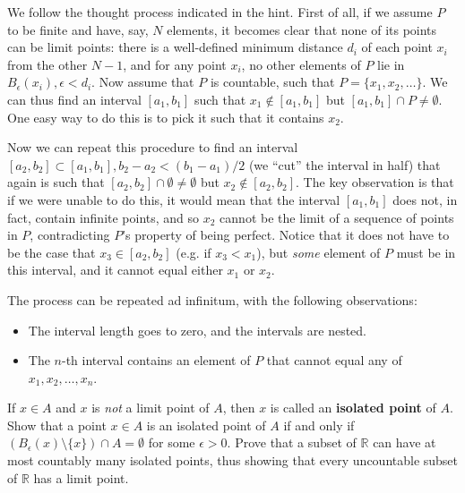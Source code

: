 \begin{solution}
    
    We follow the thought process indicated in the hint.
    First of all, if we assume $P$ to be finite and have, say, $N$ elements, it becomes clear that none of its points can be limit points: there is a well-defined minimum distance $d_i$ of each point $x_i$ from the other $N - 1$, and for any point $x_i$, no other elements of $P$ lie in $B_\epsilon(x_i), \epsilon < d_i$.
    Now assume that $P$ is countable, such that $P = \{x_1, x_2, \ldots\}$.
    We can thus find an interval $[a_1, b_1]$ such that $x_1 \notin [a_1, b_1]$ but $[a_1, b_1] \cap P \neq \emptyset$.
    One easy way to do this is to pick it such that it contains $x_2$.
    
    Now we can repeat this procedure to find an interval $[a_2, b_2] \subset [a_1, b_1], b_2 - a_2 < (b_1 - a_1)/2$ (we ``cut'' the interval in half) that again is such that $[a_2, b_2] \cap \emptyset \neq \emptyset$ but $x_2 \notin [a_2, b_2]$.
    The key observation is that if we were unable to do this, it would mean that the interval $[a_1, b_1]$ does not, in fact, contain infinite points, and so $x_2$ cannot be the limit of a sequence of points in $P$, contradicting $P$'s property of being perfect.
    Notice that it does not have to be the case that $x_3 \in [a_2, b_2]$ (e.g. if $x_3 < x_1$), but \textit{some} element of $P$ must be in this interval, and it cannot equal either $x_1$ or $x_2$.

    The process can be repeated ad infinitum, with the following observations:
    \begin{itemize}
        \item The interval length goes to zero, and the intervals are nested.
        \item The $n$-th interval contains an element of $P$ that cannot equal any of $x_1, x_2, \ldots, x_n$.
    \end{itemize}
\end{solution}

\begin{exercise}{40}
    If $x \in A$ and $x$ is \textit{not} a limit point of $A$, then $x$ is called an \textbf{isolated point} of $A$.
    Show that a point $x \in A$ is an isolated point of $A$ if and only if $(B_{\epsilon}(x) \setminus \{x\}) \cap A = \emptyset$ for some $\epsilon > 0$.
    Prove that a subset of $\mathbb{R}$ can have at most countably many isolated points, thus showing that every uncountable subset of $\mathbb{R}$ has a limit point.
\end{exercise}

